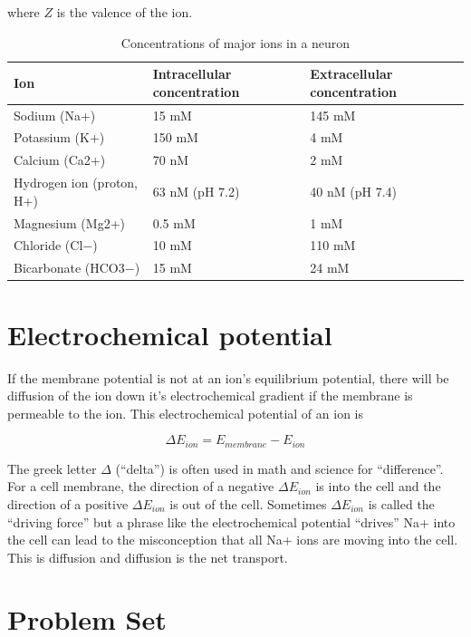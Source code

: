 \documentclass[]{book}
\begin{document}
where \(Z\) is the valence of the ion.

\begin{table}[t]

\caption{\label{tab:unnamed-chunk-1}Concentrations of major ions in a neuron}
\centering
\begin{tabular}{l|l|l}
\hline
Ion & Intracellular concentration & Extracellular concentration\\
\hline
Sodium (Na+) & 15 mM & 145 mM\\
\hline
Potassium (K+) & 150 mM & 4 mM\\
\hline
Calcium (Ca2+) & 70 nM & 2 mM\\
\hline
Hydrogen ion (proton, H+) & 63 nM (pH 7.2) & 40 nM (pH 7.4)\\
\hline
Magnesium (Mg2+) & 0.5 mM & 1 mM\\
\hline
Chloride (Cl−) & 10 mM & 110 mM\\
\hline
Bicarbonate (HCO3−) & 15 mM & 24 mM\\
\hline
\end{tabular}
\end{table}

\section{Electrochemical potential}\label{electrochemical-potential}

If the membrane potential is not at an ion's equilibrium potential,
there will be diffusion of the ion down it's electrochemical gradient if
the membrane is permeable to the ion. This electrochemical potential of
an ion is

\begin{equation}
\Delta E_{ion} = E_{membrane} - E_{ion}
\end{equation}

The greek letter \(\Delta\) (``delta'') is often used in math and
science for ``difference''. For a cell membrane, the direction of a
negative \(\Delta E_{ion}\) is into the cell and the direction of a
positive \(\Delta E_{ion}\) is out of the cell. Sometimes
\(\Delta E_{ion}\) is called the ``driving force'' but a phrase like the
electrochemical potential ``drives'' Na+ into the cell can lead to the
misconception that all Na+ ions are moving into the cell. This is
diffusion and diffusion is the net transport.

\section{Problem Set}\label{problem-set}
\end{document}
